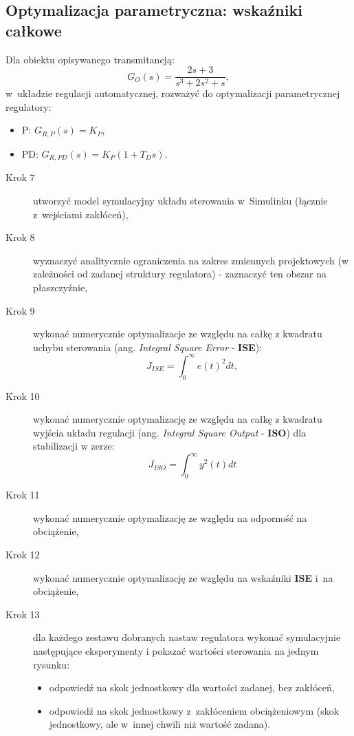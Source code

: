 \documentclass{sprawozdanie-agh}
\begin{document}
    \subsection{Optymalizacja parametryczna: wskaźniki całkowe}
    Dla obiektu opisywanego transmitancją:
    \begin{equation}
        \label{eq:system_1}
        G_{O}(s) = \frac{2s+3}{s^3+2s^2+s},
    \end{equation}
    w~układzie regulacji automatycznej, rozważyć do optymalizacji parametrycznej regulatory:
    \begin{itemize}
        \item P: $G_{R,P}(s) = K_{P}$,
        \item PD: $G_{R,PD}(s) = K_{P}(1 + T_{D}s)$.
    \end{itemize}

    \begin{description}
    \item[Krok 7] utworzyć model symulacyjny układu sterowania w~Simulinku (łącznie z~wejściami zakłóceń),
    \item[Krok 8] wyznaczyć analitycznie ograniczenia na zakres zmiennych projektowych (w zależności od zadanej struktury regulatora) - zaznaczyć ten obszar na płaszczyźnie,
    \item[Krok 9] wykonać numerycznie optymalizacje ze względu na całkę z kwadratu uchybu sterowania (ang. \textit{Integral
            Square Error} - \textbf{ISE}):
                \begin{equation}
                    \label{eq:j1}
                    J_{ISE} = \int_{0}^{\infty}{e(t)^{2}dt},
                \end{equation}
    \item[Krok 10] wykonać numerycznie optymalizację ze względu na całkę z kwadratu wyjścia układu regulacji (ang.
            \textit{Integral Square Output} - \textbf{ISO}) dla stabilizacji w zerze:
                \begin{equation}
                    \label{eq:j7}
                    J_{ISO} = \int_{0}^{\infty}{y^{2}(t)dt}
                \end{equation}
    \item[Krok 11] wykonać numerycznie optymalizację ze względu na odporność na obciążenie,
    \item[Krok 12] wykonać numerycznie optymalizację ze względu na wskaźniki \textbf{ISE} i~na obciążenie,
    \item[Krok 13] dla każdego zestawu dobranych nastaw regulatora wykonać symulacyjnie następujące eksperymenty i pokazać wartości sterowania na jednym rysunku:
        \begin{itemize}
            \item odpowiedź na skok jednostkowy dla wartości zadanej, bez zakłóceń,
            \item odpowiedź na skok jednostkowy z~zakłóceniem obciążeniowym (skok jednostkowy, ale w~innej chwili niż wartość zadana).
        \end{itemize}
    \end{description}
\end{document}

